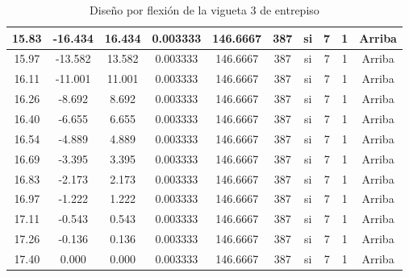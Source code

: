 \begin{table}[H]
{\begin{tabular}{|c|c|c|c|c|c|c|c|c|c|}
    \hline
    15.83 & -16.434 & 16.434 & 0.003333 & 146.6667 & 387 & si  & 7   & 1   & Arriba \bigstrut\\
    \hline
    15.97 & -13.582 & 13.582 & 0.003333 & 146.6667 & 387 & si  & 7   & 1   & Arriba \bigstrut\\
    \hline
    16.11 & -11.001 & 11.001 & 0.003333 & 146.6667 & 387 & si  & 7   & 1   & Arriba \bigstrut\\
    \hline
    16.26 & -8.692 & 8.692 & 0.003333 & 146.6667 & 387 & si  & 7   & 1   & Arriba \bigstrut\\
    \hline
    16.40 & -6.655 & 6.655 & 0.003333 & 146.6667 & 387 & si  & 7   & 1   & Arriba \bigstrut\\
    \hline
    16.54 & -4.889 & 4.889 & 0.003333 & 146.6667 & 387 & si  & 7   & 1   & Arriba \bigstrut\\
    \hline
    16.69 & -3.395 & 3.395 & 0.003333 & 146.6667 & 387 & si  & 7   & 1   & Arriba \bigstrut\\
    \hline
    16.83 & -2.173 & 2.173 & 0.003333 & 146.6667 & 387 & si  & 7   & 1   & Arriba \bigstrut\\
    \hline
    16.97 & -1.222 & 1.222 & 0.003333 & 146.6667 & 387 & si  & 7   & 1   & Arriba \bigstrut\\
    \hline
    17.11 & -0.543 & 0.543 & 0.003333 & 146.6667 & 387 & si  & 7   & 1   & Arriba \bigstrut\\
    \hline
    17.26 & -0.136 & 0.136 & 0.003333 & 146.6667 & 387 & si  & 7   & 1   & Arriba \bigstrut\\
    \hline
    17.40 & 0.000 & 0.000 & 0.003333 & 146.6667 & 387 & si  & 7   & 1   & Arriba \bigstrut\\
    \hline
    \end{tabular}%
   
}%
      \caption{Diseño por flexión de la vigueta 3 de entrepiso}
  \label{tab:F VT3 EP}%
\end{table}%
